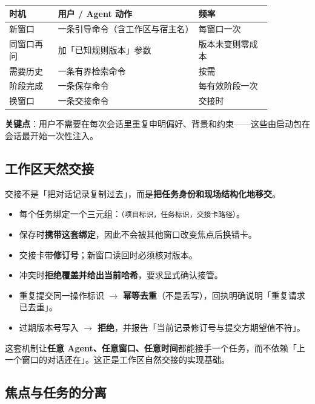 \documentclass[11pt,a4paper]{ctexart}
\begin{document}
\begin{center}
\begin{tabular}{@{}p{0.16\linewidth}p{0.46\linewidth}p{0.24\linewidth}@{}}
\toprule
\textbf{时机} & \textbf{用户 / Agent 动作} & \textbf{频率} \\
\midrule
新窗口 & 一条引导命令（含工作区与宿主名） & 每窗口一次 \\
同窗口再问 & 加「已知规则版本」参数 & 版本未变则零成本 \\
需要历史 & 一条有界检索命令 & 按需 \\
阶段完成 & 一条保存命令 & 每有效阶段一次 \\
换窗口 & 一条交接命令 & 交接时 \\
\bottomrule
\end{tabular}
\end{center}

\textbf{关键点}：用户不需要在每次会话里重复申明偏好、背景和约束——这些由启动包在会话最开始一次性注入。

\subsection{工作区天然交接}

交接不是「把对话记录复制过去」，而是\textbf{把任务身份和现场结构化地移交}。

\begin{itemize}
  \item 每个任务绑定一个三元组：\texttt{（项目标识，任务标识，交接卡路径）}。
  \item 保存时\textbf{携带这套绑定}，因此不会被其他窗口改变焦点后换错卡。
  \item 交接卡带\textbf{修订号}；新窗口读回时必须核对版本。
  \item 冲突时\textbf{拒绝覆盖并给出当前哈希}，要求显式确认接管。
  \item 重复提交同一操作标识 $\rightarrow$ \textbf{幂等去重}（不是丢写），回执明确说明「重复请求已去重」。
  \item 过期版本号写入 $\rightarrow$ \textbf{拒绝}，并报告「当前记录修订号与提交方期望值不符」。
\end{itemize}

这套机制让\textbf{任意 Agent、任意窗口、任意时间}都能接手一个任务，而不依赖「上一个窗口的对话还在」。这正是工作区自然交接的实现基础。

\subsection{焦点与任务的分离}
\end{document}
